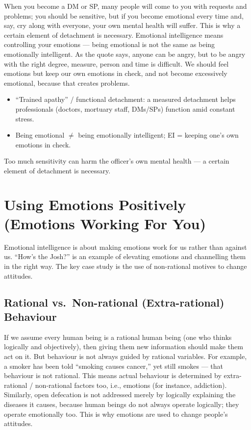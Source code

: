 When you become a DM or SP, many people will come to you with requests and problems; you should be sensitive, but if you become emotional every time and, say, cry along with everyone, your own mental health will suffer. This is why a certain element of detachment is necessary. Emotional intelligence means controlling your emotions --- being emotional is not the same as being emotionally intelligent. As the quote says, anyone can be angry, but to be angry with the right degree, measure, person and time is difficult. We should feel emotions but keep our own emotions in check, and not become excessively emotional, because that creates problems.

\begin{KeyConcept}
\begin{itemize}
\item ``Trained apathy'' / functional detachment: a measured detachment helps professionals (doctors, mortuary staff, DMs/SPs) function amid constant stress.
\item Being emotional $\neq$ being emotionally intelligent; EI = keeping one's own emotions in check.
\end{itemize}
\end{KeyConcept}

\begin{CriticalPoint}
Too much sensitivity can harm the officer's own mental health --- a certain element of detachment is necessary.
\end{CriticalPoint}

\section{Using Emotions Positively (Emotions Working For You)}

Emotional intelligence is about making emotions work for us rather than against us. ``How's the Josh?'' is an example of elevating emotions and channelling them in the right way. The key case study is the use of non-rational motives to change attitudes.

\subsection{Rational vs.\ Non-rational (Extra-rational) Behaviour}

If we assume every human being is a rational human being (one who thinks logically and objectively), then giving them new information should make them act on it. But behaviour is not always guided by rational variables. For example, a smoker has been told ``smoking causes cancer,'' yet still smokes --- that behaviour is not rational. This means actual behaviour is determined by extra-rational / non-rational factors too, i.e., emotions (for instance, addiction). Similarly, open defecation is not addressed merely by logically explaining the diseases it causes, because human beings do not always operate logically; they operate emotionally too. This is why emotions are used to change people's attitudes.

